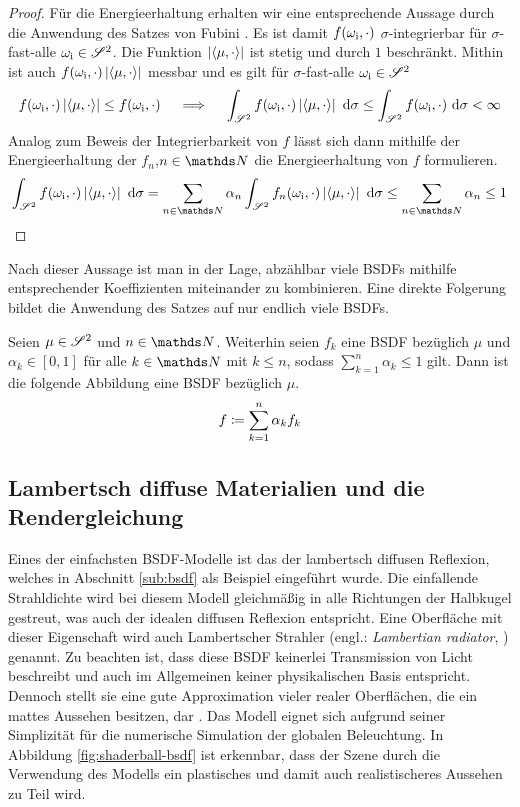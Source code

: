 \begin{proof}
			Für die Energieerhaltung erhalten wir eine entsprechende Aussage durch die Anwendung des Satzes von Fubini \cite[S.~175~f]{measure-theory}.
			Es ist damit $f(\omega_{\mathrm{i}},\cdot)$ $\sigma$-integrierbar für $\sigma$-fast-alle $\omega_{\mathrm{i}}\in\mathscr{S}^{2}$.
			Die Funktion $\left\vert \left\langle \mu,\cdot \right\rangle \right\vert$ ist stetig und durch $1$ beschränkt.
			Mithin ist auch $f(\omega_{\mathrm{i}},\cdot)\left\vert \left\langle \mu,\cdot \right\rangle \right\vert$ messbar und es gilt für $\sigma$-fast-alle $\omega_{\mathrm{i}}\in\mathscr{S}^{2}$
			\[
				f(\omega_{\mathrm{i}},\cdot)\left\vert \left\langle \mu,\cdot \right\rangle \right\vert \leq f(\omega_{\mathrm{i}},\cdot) \quad \implies \quad \int_{\mathscr{S}^{2}}^{} f(\omega_{\mathrm{i}},\cdot)\left\vert \left\langle \mu,\cdot \right\rangle \right\vert\ \mathrm{d} \sigma \leq \int_{\mathscr{S}^{2}}^{} f(\omega_{\mathrm{i}},\cdot)\ \mathrm{d} \sigma < \infty
			\]
			Analog zum Beweis der Integrierbarkeit von $f$ lässt sich dann mithilfe der Energieerhaltung der $f_n$,$n\in\SN$ die Energieerhaltung von $f$ formulieren.
			\[
				\integral{\ssp}{}{f(\omega_\m{i},\cdot)\abs{\dotp{\mu}{\cdot}}}{\sigma} = \sum_{n\in\SN}\alpha_n \integral{\ssp}{}{f_n(\omega_\m{i},\cdot)\abs{\dotp{\mu}{\cdot}}}{\sigma} \leq \sum_{n\in\SN}\alpha_n \leq 1
			\]
		\end{proof}

		Nach dieser Aussage ist man in der Lage, abzählbar viele BSDFs mithilfe entsprechender Koeffizienten miteinander zu kombinieren.
		Eine direkte Folgerung bildet die Anwendung des Satzes auf nur endlich viele BSDFs.
		\begin{corollary*}
			Seien $\mu\in\mathscr{S}^{2}$ und $n\in\SN$.
			Weiterhin seien $f_k$ eine BSDF bezüglich $\mu$ und $\alpha_k\in[0,1]$ für alle $k\in\SN$ mit $k\leq n$, sodass $\sum_{k=1}^n \alpha_k \leq 1$ gilt.
			Dann ist die folgende Abbildung eine BSDF bezüglich $\mu$.
			\[
				f\coloneqq \sum_{k=1}^n\alpha_k f_k
			\]
		\end{corollary*}


	\subsection{Lambertsch diffuse Materialien und die Rendergleichung} %
	\label{sub:lambertsch_diffuse_materialien_und_die_rendergleichung}

		Eines der einfachsten BSDF-Modelle ist das der lambertsch diffusen Reflexion, welches in Abschnitt \ref{sub:bsdf} als Beispiel eingeführt wurde.
		Die einfallende Strahldichte wird bei diesem Modell gleichmäßig in alle Richtungen der Halbkugel gestreut, was auch der idealen diffusen Reflexion entspricht.
		Eine Oberfläche mit dieser Eigenschaft wird auch Lambertscher Strahler (engl.: \textit{Lambertian radiator}, \cite[S.~17]{intro-radiometry}) genannt.
		Zu beachten ist, dass diese BSDF keinerlei Transmission von Licht beschreibt und auch im Allgemeinen keiner physikalischen Basis entspricht.
		Dennoch stellt sie eine gute Approximation vieler realer Oberflächen, die ein mattes Aussehen besitzen, dar \cite[S.~532]{pbrt3}.
		Das Modell eignet sich aufgrund seiner Simplizität für die numerische Simulation der globalen Beleuchtung.
		In Abbildung \ref{fig:shaderball-bsdf} ist erkennbar, dass der Szene durch die Verwendung des Modells ein plastisches und damit auch realistischeres Aussehen zu Teil wird.

